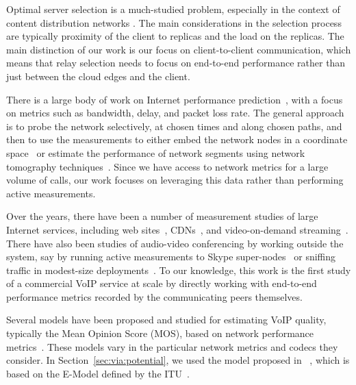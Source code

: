  Optimal server selection is a much-studied problem, especially in the context of content distribution networks \cite{DONAR-Sigcomm10,ServerSelection-ICDCS11}. The main considerations in the selection process are typically proximity of the client to replicas and the load on the replicas. The main distinction of our work is our focus on client-to-client communication, which means that relay selection needs to focus on end-to-end performance rather than just between the cloud edges and the client.

 There is a large body of work on Internet performance prediction~\cite{IDMaps-ToN01,GNP-Infocom02,iplaneosdi}, with a focus on metrics such as bandwidth, delay, and packet loss rate. The general approach is to probe the network selectively, at chosen times and along chosen paths, and then to use the measurements to either embed the network nodes in a coordinate space~\cite{Vivaldi-Sigcomm04} or estimate the performance of network segments using network tomography techniques~\cite{Tomography-StatSci04}.
 Since we have access to network metrics for a large volume of calls, our work focuses on leveraging this data rather than performing active measurements.


 Over the years, there have been a number of measurement studies of large Internet services, including web sites~\cite{Padmanabhan-Sigcomm00},  CDNs~\cite{CDN-OSDI02}, and video-on-demand streaming~\cite{Streaming-Usits01,Conviva-Sigcomm11}. There have also been studies of audio-video conferencing by working outside the system, say by running active measurements to Skype super-nodes~\cite{SkypeMeasurement-IPTPS07} or sniffing traffic in modest-size deployments~\cite{VideoTelephony-IMC12}. 
To our knowledge, this work is the first study of a commercial VoIP service at scale by directly working with end-to-end performance metrics recorded by the communicating peers themselves.

 Several models have been proposed and studied for estimating VoIP quality, typically the Mean Opinion Score (MOS), based on network performance metrics~\cite{cole,SkypeUserSatisfaction-Sigcomm06,SkypeMeasurement-IPTPS07,SkypeQuality-WMUST12,SkypeQoE-Multimedia12}. These models vary in the particular network metrics and codecs they consider. In Section~\ref{sec:via:potential}, we used the model proposed in ~\cite{cole}, which is based on the E-Model defined by the ITU~\cite{itu-e-model15}. 
